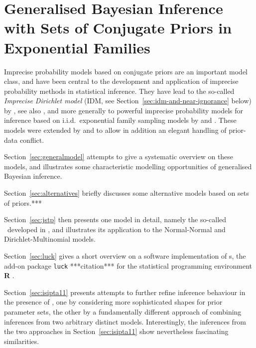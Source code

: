 \chapter{Generalised Bayesian Inference with Sets of Conjugate Priors in Exponential Families}
\label{cha:imprecisebayes-conjugate}

Imprecise probability models based on conjugate priors are an important model class,
and have been central to the development and application of imprecise probability methods
in statistical inference.
They have lead to the so-called \emph{Imprecise Dirichlet model} (IDM, see Section~\ref{sec:idm-and-near-ignorance} below)
by \textcite{1996:walley::idm}, see also \textcite{2009:bernard},
and more generally to powerful imprecise probability models for inference
based on i.i.d.\ exponential family sampling models by \textcite{2005:quaeghebeurcooman} and \textcite{2009:quaeghebeur::phd}.
These models were extended by \textcite[see Section~\ref{sec:jstp}]{Walter2009a} and \textcite[see Section~\ref{sec:isipta11}]{Walter2011a}
to allow in addition an elegant handling of prior-data conflict.

\medskip

Section~\ref{sec:generalmodel} attempts to give a systematic overview on these models, %
and illustrates some characteristic modelling opportunities of generalised Bayesian inference.

Section~\ref{sec:alternatives} briefly discusses some alternative models based on sets of priors.***

Section~\ref{sec:jstp} then presents one model in detail, namely the so-called
\nymodel\ developed in \textcite{Walter2009a},
and illustrates its application to the Normal-Normal and Dirichlet-Multinomial models. %

Section~\ref{sec:luck} gives a short overview on a software implementation of \nymodel s,
the add-on package \texttt{luck} ***citation*** for the statistical programming environment \textbf{R} \parencite{2013:r}.


Section~\ref{sec:isipta11} presents attempts to further refine inference behaviour in the presence of \pdc,
one by considering more sophisticated shapes for prior parameter sets,
the other by a fundamentally different approach of combining inferences from two arbitrary distinct models.
Interestingly, the inferences from the two approaches in Section~\ref{sec:isipta11} show nevertheless fascinating similarities.

